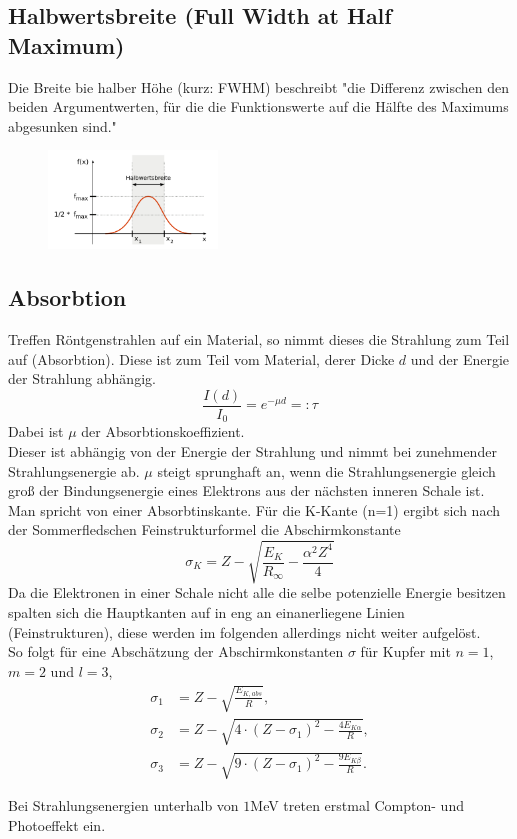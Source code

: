 \subsection{Halbwertsbreite (Full Width at Half Maximum)}
Die Breite bie halber Höhe (kurz: FWHM) beschreibt "die Differenz zwischen 
den beiden Argumentwerten, für die die Funktionswerte auf die 
Hälfte des Maximums abgesunken sind."\cite{wiki2}
\begin{figure}
    \centering
    \includegraphics[width=0.4\textwidth]{plots/Halbwertsbreite.png}
    \caption{}
\end{figure}
\subsection{Absorbtion}
Treffen Röntgenstrahlen auf ein Material, so nimmt dieses die Strahlung zum Teil
auf (Absorbtion). Diese ist zum Teil vom Material, derer Dicke $d$ und der Energie 
der Strahlung abhängig.
\begin{equation}
    \frac{I(d)}{I_0}=e^{-\mu d}=:\tau
\end{equation}
Dabei ist $\mu$ der Absorbtionskoeffizient.\\
Dieser ist abhängig von der Energie der Strahlung und nimmt bei zunehmender
Strahlungsenergie ab. $\mu$ steigt sprunghaft an, wenn die Strahlungsenergie
gleich groß der Bindungsenergie eines Elektrons aus der nächsten inneren Schale ist.
Man spricht von einer Absorbtinskante.
Für die K-Kante (n=1) ergibt sich nach der Sommerfledschen Feinstrukturformel
die Abschirmkonstante
\begin{equation}
    \sigma_K=Z-\sqrt{\frac{E_K}{R_{\infty}}-\frac{\alpha^2Z^4}{4}}
    \label{eqn:sigmaZ}
\end{equation}
Da die Elektronen in einer Schale nicht alle die selbe potenzielle Energie
besitzen spalten sich die Hauptkanten auf in eng an einanerliegene Linien (Feinstrukturen),
diese werden im folgenden allerdings nicht weiter aufgelöst.\\
So folgt für eine Abschätzung der Abschirmkonstanten $\sigma$ für Kupfer
mit $n=1$,$m=2$ und $l=3$,
\begin{align}
    \sigma_1 &= Z-\sqrt{\frac{E_{K,abs}}{R}},\\
    \sigma_2 &= Z-\sqrt{4\cdot (Z-\sigma_1)^2-\frac{4E_{K\alpha}}{R}}, \\
    \sigma_3 &= Z-\sqrt{9\cdot(Z-\sigma_1)^2-\frac{9E_{K\beta}}{R}} .
    \label{eqn:sigma}
\end{align}

Bei Strahlungsenergien unterhalb von $1$MeV treten erstmal Compton- und Photoeffekt ein.




